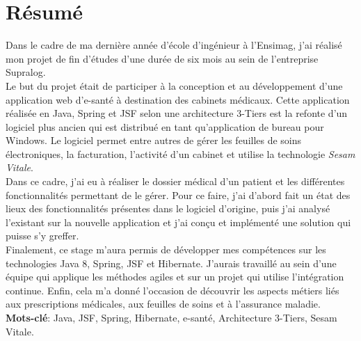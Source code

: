 \newpage
\section*{Résumé}  

Dans le cadre de ma dernière année d'école d'ingénieur à l’Ensimag, j’ai réalisé mon projet de fin d’études d’une durée de six mois au sein de l’entreprise Supralog.\\

Le but du projet était de participer à la conception et au développement d’une application web d’e-santé à destination des cabinets médicaux. Cette application réalisée en Java, Spring et JSF selon une architecture 3-Tiers est la refonte d'un logiciel plus ancien qui est distribué en tant qu'application de bureau pour Windows. Le logiciel permet entre autres de gérer les feuilles de soins électroniques, la facturation, l'activité d'un cabinet et utilise la technologie \textit{\gls{Sesam Vitale}}.\\

Dans ce cadre, j’ai eu à réaliser le dossier médical d'un patient et les différentes fonctionnalités permettant de le gérer. Pour ce faire, j'ai d'abord fait un état des lieux des fonctionnalités présentes dans le logiciel d'origine, puis j'ai analysé l'existant sur la nouvelle application et j'ai conçu et implémenté une solution qui puisse s'y greffer.\\

Finalement, ce stage m'aura permis de développer mes compétences sur les technologies Java 8, Spring, JSF et Hibernate. J'aurais  travaillé au sein d'une équipe qui applique les méthodes agiles et sur un projet qui utilise l'intégration continue. Enfin, cela m'a donné l'occasion de découvrir les aspects métiers liés aux prescriptions médicales, aux feuilles de soins et à l'assurance maladie.\\

\textbf{Mots-clé}: Java, JSF, Spring, Hibernate, e-santé, Architecture 3-Tiers, Sesam Vitale.